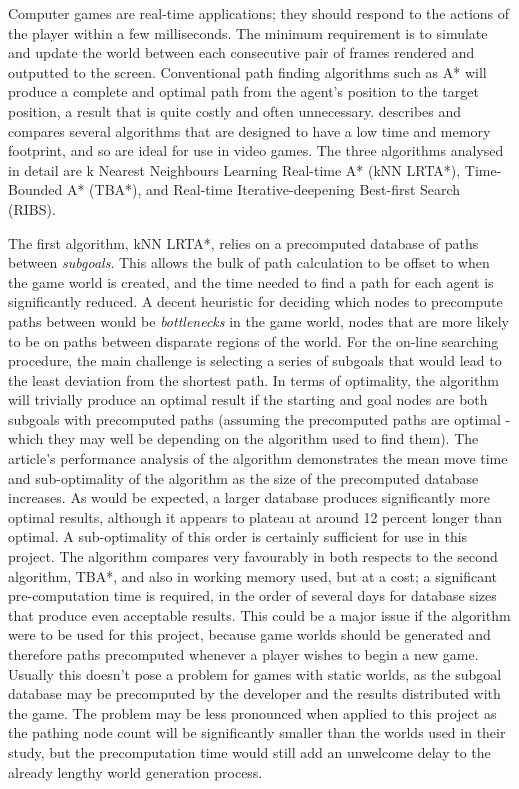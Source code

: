 \documentclass[a4paper,12pt]{article}
\begin{document}
Computer games are real-time applications; they should respond to the actions of the player within a few milliseconds. The minimum requirement is to simulate and update the world between each consecutive pair of frames rendered and outputted to the screen. Conventional path finding algorithms such as A* \cite{hart68} will produce a complete and optimal path from the agent's position to the target position, a result that is quite costly and often unnecessary.  describes and compares several algorithms that are designed to have a low time and memory footprint, and so are ideal for use in video games. The three algorithms analysed in detail are k Nearest Neighbours Learning Real-time A* (kNN LRTA*), Time-Bounded A* (TBA*), and Real-time Iterative-deepening Best-first Search (RIBS).

The first algorithm, kNN LRTA*, relies on a precomputed database of paths between \emph{subgoals}. This allows the bulk of path calculation to be offset to when the game world is created, and the time needed to find a path for each agent is significantly reduced. A decent heuristic for deciding which nodes to precompute paths between would be \emph{bottlenecks} in the game world, nodes that are more likely to be on paths between disparate regions of the world. For the on-line searching procedure, the main challenge is selecting a series of subgoals that would lead to the least deviation from the shortest path. In terms of optimality, the algorithm will trivially produce an optimal result if the starting and goal nodes are both subgoals with precomputed paths (assuming the precomputed paths are optimal - which they may well be depending on the algorithm used to find them). The article's performance analysis of the algorithm demonstrates the mean move time and sub-optimality of the algorithm as the size of the precomputed database increases. As would be expected, a larger database produces significantly more optimal results, although it appears to plateau at around 12 percent longer than optimal. A sub-optimality of this order is certainly sufficient for use in this project. The algorithm compares very favourably in both respects to the second algorithm, TBA*, and also in working memory used, but at a cost; a significant pre-computation time is required, in the order of several days for database sizes that produce even acceptable results. This could be a major issue if the algorithm were to be used for this project, because game worlds should be generated and therefore paths precomputed whenever a player wishes to begin a new game. Usually this doesn't pose a problem for games with static worlds, as the subgoal database may be precomputed by the developer and the results distributed with the game. The problem may be less pronounced when applied to this project as the pathing node count will be significantly smaller than the worlds used in their study, but the precomputation time would still add an unwelcome delay to the already lengthy world generation process.
\end{document}
